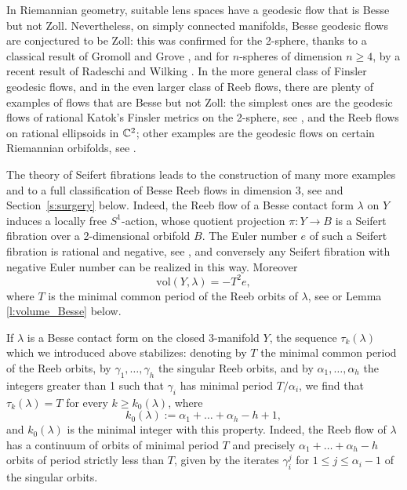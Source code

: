 \documentclass[11pt]{article}
\numberwithin{equation}{section}
\theoremstyle{definition}
\newcommand{\vol}{\mathrm{vol}}
\let\eul e
\begin{document}
In Riemannian geometry, suitable lens spaces have a geodesic flow that is Besse but not Zoll. Nevertheless, on simply connected manifolds, Besse geodesic flows are conjectured to be Zoll: this was confirmed for the 2-sphere, thanks to a classical result of Gromoll and Grove \cite{Gromoll:1981kl}, and for $n$-spheres of dimension $n\geq 4$, by a recent result of Radeschi and Wilking \cite{Radeschi:2017dz}. In the more general class of Finsler geodesic flows, and in the even larger class of Reeb flows, there are plenty of examples of flows that are Besse but not Zoll: the simplest ones are the geodesic flows of rational Katok's Finsler metrics on the 2-sphere, see \cite{Katok:1973mw,Ziller:1983rw}, and the Reeb flows on rational ellipsoids in $\mathbb{C}^2$; other examples are the geodesic flows on certain Riemannian orbifolds, see \cite{Besse:1978pr,Lange:2020,Lange:2021}.

The theory of Seifert fibrations leads to the construction of many more examples and to a full classification of Besse Reeb flows in dimension $3$, see \cite{Kegel:2021vo} and Section~\ref{s:surgery} below. Indeed, the Reeb flow of a Besse contact form $\lambda$ on $Y$ induces a locally free $S^1$-action, whose quotient projection $\pi: Y \to B$ is a Seifert fibration over a 2-dimensional orbifold $B$. The Euler number $\eul$ of such a Seifert fibration is rational and negative, see \cite{Lisca:2004oz}, and conversely any Seifert fibration with negative Euler number can be realized in this way. Moreover
\begin{equation}
\label{volumeBesse}
\vol(Y,\lambda) = -T^2 \eul,
\end{equation}
where $T$ is the minimal common period of the Reeb orbits of $\lambda$, see \cite[Cor.\,6.3]{Geiges:2020aa} or Lemma \ref{l:volume_Besse} below.

If $\lambda$ is a Besse contact form on the closed $3$-manifold $Y$, the sequence $\tau_k(\lambda)$ which we introduced above stabilizes: denoting by $T$ the minimal common period of the Reeb orbits, by $\gamma_1,\dots,\gamma_h$ the singular Reeb orbits, and by $\alpha_1,\dots,\alpha_h$ the integers greater than 1 such that $\gamma_i$ has minimal period $T/\alpha_i$, we find that $\tau_k(\lambda)=T$ for every $k\geq k_0(\lambda)$, where
\[
k_0(\lambda):= \alpha_1+\dots+\alpha_h - h + 1,
\]
and $k_0(\lambda)$ is the minimal integer with this property. Indeed, the Reeb flow of $\lambda$ has a continuum of orbits of minimal period $T$ and precisely $\alpha_1+\dots+\alpha_h - h$ orbits of period strictly less than $T$, given by the iterates $\gamma_i^j$ for $1\leq j \leq \alpha_i - 1$ of the singular orbits.
\end{document}
